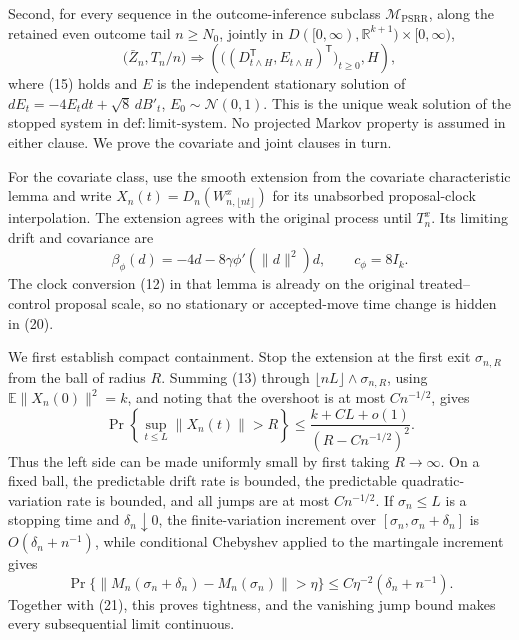 Second, for every sequence in the outcome-inference subclass \(\mathcal M_{\mathrm{PSRR}}\), along the retained even outcome tail \(n\ge N_0\), jointly in \(D([0,\infty),\mathbb R^{k+1})\times[0,\infty)\),
\[
 \bigl(\bar Z_n,T_n/n\bigr)\Rightarrow
 \left(\bigl((D_{t\wedge H}^{\mathsf T},E_{t\wedge H})^{\mathsf T}\bigr)_{t\ge0},H\right), \tag{19}
\]
where (15) holds and \(E\) is the independent stationary solution of \(dE_t=-4E_tdt+\sqrt8\,dB'_t\), \(E_0\sim\mathcal N(0,1)\).  This is the unique weak solution of the stopped system in \(\mathrm{def{:}limit\mbox{-}system}\).  No projected Markov property is assumed in either clause.
We prove the covariate and joint clauses in turn.

For the covariate class, use the smooth extension from the covariate characteristic lemma and write \(X_n(t)=D_n(W^x_{n,\lfloor nt\rfloor})\) for its unabsorbed proposal-clock interpolation.  The extension agrees with the original process until \(T_n^x\).  Its limiting drift and covariance are
\[
 \beta_\phi(d)=-4d-8\gamma\phi'(\|d\|^2)d,
 \qquad c_\phi=8I_k. \tag{20}
\]
The clock conversion (12) in that lemma is already on the original treated--control proposal scale, so no stationary or accepted-move time change is hidden in (20).

We first establish compact containment.  Stop the extension at the first exit \(\sigma_{n,R}\) from the ball of radius \(R\).  Summing (13) through \(\lfloor nL\rfloor\wedge\sigma_{n,R}\), using \(\mathbb E\|X_n(0)\|^2=k\), and noting that the overshoot is at most \(Cn^{-1/2}\), gives
\[
 \Pr\left\{\sup_{t\le L}\|X_n(t)\|>R\right\}
 \le\frac{k+CL+o(1)}{(R-Cn^{-1/2})^2}. \tag{21}
\]
Thus the left side can be made uniformly small by first taking \(R\to\infty\).  On a fixed ball, the predictable drift rate is bounded, the predictable quadratic-variation rate is bounded, and all jumps are at most \(Cn^{-1/2}\).  If \(\sigma_n\le L\) is a stopping time and \(\delta_n\downarrow0\), the finite-variation increment over \([\sigma_n,\sigma_n+\delta_n]\) is \(O(\delta_n+n^{-1})\), while conditional Chebyshev applied to the martingale increment gives
\[
 \Pr\{\|M_n(\sigma_n+\delta_n)-M_n(\sigma_n)\|>\eta\}
 \le C\eta^{-2}(\delta_n+n^{-1}). \tag{22}
\]
Together with (21), this proves tightness, and the vanishing jump bound makes every subsequential limit continuous.


